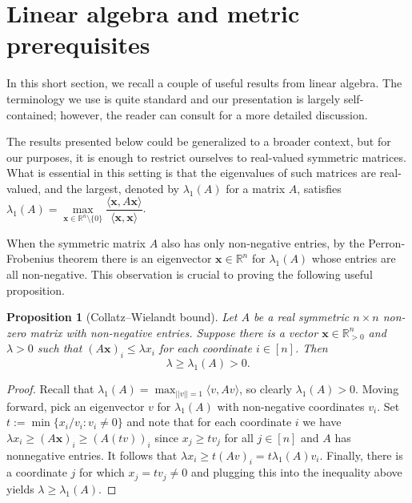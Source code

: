 \documentclass[12pt]{article}
\newtheorem{dfn}[thm]{Definition}
\newtheorem{prop}[thm]{Proposition}
\begin{document}
\section{Linear algebra and metric prerequisites}\label{sec:linalg}

In this short section, we recall a couple of useful results from linear algebra. The terminology we use is quite standard and our presentation is largely self-contained; however, the reader can consult \cite{booklinalg} for a more detailed discussion.



The results presented below could be generalized to a broader context, but for our purposes, it is enough to restrict ourselves to real-valued symmetric matrices. What is essential in this setting is that the eigenvalues of such matrices are real-valued, and the largest, denoted by $\lambda_1(A)$ for a matrix $A$, satisfies $\lambda_1(A)=\underset{\mathbf{x}\in \mathbb{R}^n\setminus\{0\}}{\max}\dfrac{\langle \mathbf{x},A\mathbf{x} \rangle}{\langle \mathbf{x},\mathbf{x} \rangle}$. 

When the symmetric matrix $A$ also has only non-negative entries, by the Perron-Frobenius theorem there is an eigenvector $\mathbf{x}\in \mathbb{R}^n$ for $\lambda_1(A)$ whose entries are all non-negative. This observation is crucial to proving the following useful proposition. 

\begin{prop}[Collatz--Wielandt bound]\label{vector-test-criterion}
 Let $A$ be a real symmetric $n\times n$ non-zero matrix with non-negative entries. Suppose there is a vector $\mathbf{x}\in \mathbb{R}^n_{> 0}$ and $\lambda>0$ such that $(A\mathbf{x})_i\leq \lambda x_i$ for each coordinate $i\in [n]$. Then $$\lambda\geq \lambda_1(A)>0.$$
\end{prop}

\begin{proof}
  Recall that $\lambda_1(A)=\max_{||v||=1}\langle v,Av\rangle$, so clearly $\lambda_1(A)>0$. Moving forward, pick an eigenvector $v$ for $\lambda_1(A)$ with non-negative coordinates $v_i$. Set $t:=\min \{x_i/v_i: v_i\neq 0\}$ and note that for each coordinate $i$ we have $\lambda x_i\geq (A\mathbf{x})_i\geq \left(A(tv)\right)_i$ since $x_j\geq tv_j$ for all $j\in[n]$ and $A$ has nonnegative entries. It follows that $\lambda x_i\geq t(Av)_i=t\lambda_1(A)v_i$. Finally, there is a coordinate $j$ for which $x_j=tv_j\neq 0$ and plugging this into the inequality above yields $\lambda\geq \lambda_1(A)$. 
\end{proof}
\end{document}
